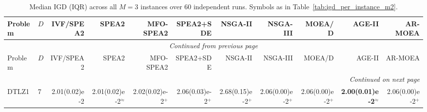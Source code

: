 \documentclass[pdflatex,sn-mathphys-ay]{sn-jnl}%
\theoremstyle{thmstyleone}%
\theoremstyle{thmstyletwo}%
\theoremstyle{thmstylethree}%
\begin{document}
\clearpage
\begin{landscape}
	{\tiny
		\setlength{\tabcolsep}{2pt}%
		\renewcommand{\arraystretch}{0.95}%
		\begin{longtable}{llrrrrrrrrr}
			\caption{Median IGD (IQR) across all $M=3$ instances over 60 independent runs. Symbols as in Table~\ref{tab:igd_per_instance_m2}.}
			\label{tab:igd_per_instance_m3}                                                                                                                                                                                                                                                                                                        \\
			\toprule
			Problem                           & $D$ & IVF/SPEA2              & SPEA2                      & MFO-SPEA2                          & SPEA2+SDE                          & NSGA-II                   & NSGA-III                     & MOEA/D                        & AGE-II                             & AR-MOEA                      \\
			\midrule
			\endfirsthead
			\multicolumn{11}{c}{{\textit{Continued from previous page}}}                                                                                                                                                                                                                                                                           \\
			\toprule
			Problem                           & $D$ & IVF/SPEA2              & SPEA2                      & MFO-SPEA2                          & SPEA2+SDE                          & NSGA-II                   & NSGA-III                     & MOEA/D                        & AGE-II                             & AR-MOEA                      \\
			\midrule
			\endhead
			\midrule
			\multicolumn{11}{r}{{\textit{Continued on next page}}}                                                                                                                                                                                                                                                                                 \\
			\endfoot
			\botrule
			\endlastfoot
			DTLZ1                             & 7   & 2.01(0.02)e-2          & 2.01(0.02)e-2$^{\approx}$  & 2.02(0.02)e-2$^{+}$                & 2.06(0.03)e-2$^{+}$                & 2.68(0.15)e-2$^{+}$       & 2.06(0.00)e-2$^{+}$          & 2.06(0.00)e-2$^{+}$           & \textbf{2.00(0.01)e-2}$^{\approx}$ & 2.06(0.00)e-2$^{+}$          \\

\end{longtable}}
\end{landscape}
\end{document}
